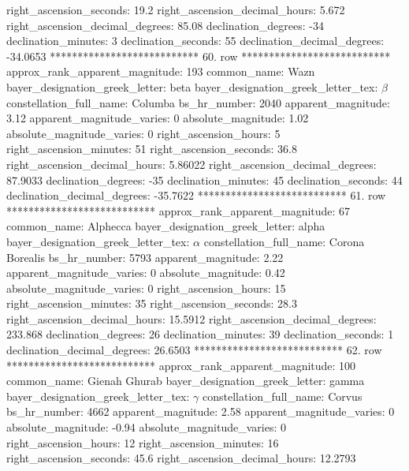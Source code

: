            right_ascension_seconds: 19.2
     right_ascension_decimal_hours: 5.672
   right_ascension_decimal_degrees: 85.08
               declination_degrees: -34
               declination_minutes: 3
               declination_seconds: 55
       declination_decimal_degrees: -34.0653
*************************** 60. row ***************************
    approx_rank_apparent_magnitude: 193
                       common_name: Wazn
    bayer_designation_greek_letter: beta
bayer_designation_greek_letter_tex: $\beta$
           constellation_full_name: Columba
                      bs_hr_number: 2040
                apparent_magnitude: 3.12
         apparent_magnitude_varies: 0
                absolute_magnitude: 1.02
         absolute_magnitude_varies: 0
             right_ascension_hours: 5
           right_ascension_minutes: 51
           right_ascension_seconds: 36.8
     right_ascension_decimal_hours: 5.86022
   right_ascension_decimal_degrees: 87.9033
               declination_degrees: -35
               declination_minutes: 45
               declination_seconds: 44
       declination_decimal_degrees: -35.7622
*************************** 61. row ***************************
    approx_rank_apparent_magnitude: 67
                       common_name: Alphecca
    bayer_designation_greek_letter: alpha
bayer_designation_greek_letter_tex: $\alpha$
           constellation_full_name: Corona Borealis
                      bs_hr_number: 5793
                apparent_magnitude: 2.22
         apparent_magnitude_varies: 0
                absolute_magnitude: 0.42
         absolute_magnitude_varies: 0
             right_ascension_hours: 15
           right_ascension_minutes: 35
           right_ascension_seconds: 28.3
     right_ascension_decimal_hours: 15.5912
   right_ascension_decimal_degrees: 233.868
               declination_degrees: 26
               declination_minutes: 39
               declination_seconds: 1
       declination_decimal_degrees: 26.6503
*************************** 62. row ***************************
    approx_rank_apparent_magnitude: 100
                       common_name: Gienah Ghurab
    bayer_designation_greek_letter: gamma
bayer_designation_greek_letter_tex: $\gamma$
           constellation_full_name: Corvus
                      bs_hr_number: 4662
                apparent_magnitude: 2.58
         apparent_magnitude_varies: 0
                absolute_magnitude: -0.94
         absolute_magnitude_varies: 0
             right_ascension_hours: 12
           right_ascension_minutes: 16
           right_ascension_seconds: 45.6
     right_ascension_decimal_hours: 12.2793
